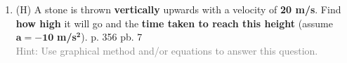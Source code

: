 \documentclass[A4,12pt]{article}
\begin{document}
\begin{enumerate}[label=\bfseries (\arabic*)]
\item (H) A stone is thrown \textbf{vertically} upwards with a velocity of \textbf{20 m/s}. Find \textbf{how high} it will go and the \textbf{time taken to reach this height} (assume $\bm{a = -10 }$\textbf{ m/s}$\bm{^2}$). \cite{CCEADA} p. 356 pb. 7\\
\textcolor{gray}{Hint: Use graphical method and/or equations to answer this question.}
%


























\end{enumerate}
\end{document}
